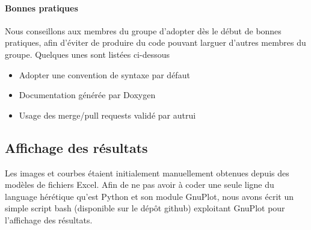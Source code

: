 \paragraph{Bonnes pratiques}
Nous conseillons aux membres du groupe d'adopter dès le début de bonnes pratiques, afin d'éviter de produire du code pouvant larguer d'autres membres du groupe. Quelques unes sont listées ci-dessous
\begin{itemize}
\item Adopter une convention de syntaxe par défaut
\item Documentation générée par Doxygen 
\item Usage des merge/pull requests validé par autrui
\end{itemize}

\subsection{Affichage des résultats}
Les images et courbes étaient initialement manuellement obtenues depuis des modèles de fichiers Excel.
Afin de ne pas avoir à coder une seule ligne du language hérétique qu'est Python et son module GnuPlot, nous avons écrit un simple script bash (disponible sur le dépôt github) exploitant GnuPlot pour l'affichage des résultats. 



